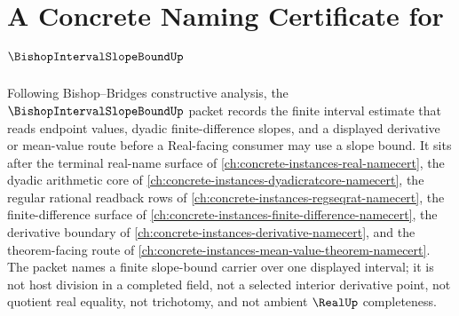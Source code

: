 \chapter{A Concrete Naming Certificate for $\BishopIntervalSlopeBoundUp$}
\label{ch:concrete-instances-bishop-interval-slope-bound-namecert}

Following Bishop--Bridges constructive analysis, the $\BishopIntervalSlopeBoundUp$ packet records the finite interval estimate that reads endpoint values, dyadic finite-difference slopes, and a displayed derivative or mean-value route before a Real-facing consumer may use a slope bound. It sits after the terminal real-name surface of \autoref{ch:concrete-instances-real-namecert}, the dyadic arithmetic core of \autoref{ch:concrete-instances-dyadicratcore-namecert}, the regular rational readback rows of \autoref{ch:concrete-instances-regseqrat-namecert}, the finite-difference surface of \autoref{ch:concrete-instances-finite-difference-namecert}, the derivative boundary of \autoref{ch:concrete-instances-derivative-namecert}, and the theorem-facing route of \autoref{ch:concrete-instances-mean-value-theorem-namecert}. The packet names a finite slope-bound carrier over one displayed interval; it is not host division in a completed field, not a selected interior derivative point, not quotient real equality, not trichotomy, and not ambient $\RealUp$ completeness.

